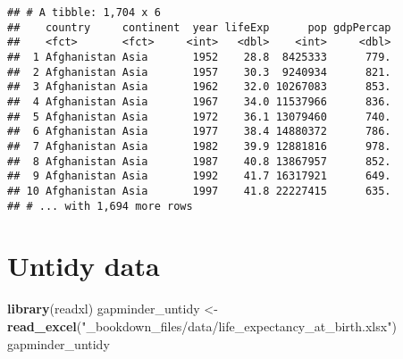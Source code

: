 \documentclass[]{book}
\newenvironment{Shaded}{\begin{snugshade}}{\end{snugshade}}
\newcommand{\KeywordTok}[1]{\textcolor[rgb]{0.13,0.29,0.53}{\textbf{#1}}}
\newcommand{\NormalTok}[1]{#1}
\newcommand{\StringTok}[1]{\textcolor[rgb]{0.31,0.60,0.02}{#1}}
\begin{document}
\begin{verbatim}
## # A tibble: 1,704 x 6
##    country     continent  year lifeExp      pop gdpPercap
##    <fct>       <fct>     <int>   <dbl>    <int>     <dbl>
##  1 Afghanistan Asia       1952    28.8  8425333      779.
##  2 Afghanistan Asia       1957    30.3  9240934      821.
##  3 Afghanistan Asia       1962    32.0 10267083      853.
##  4 Afghanistan Asia       1967    34.0 11537966      836.
##  5 Afghanistan Asia       1972    36.1 13079460      740.
##  6 Afghanistan Asia       1977    38.4 14880372      786.
##  7 Afghanistan Asia       1982    39.9 12881816      978.
##  8 Afghanistan Asia       1987    40.8 13867957      852.
##  9 Afghanistan Asia       1992    41.7 16317921      649.
## 10 Afghanistan Asia       1997    41.8 22227415      635.
## # ... with 1,694 more rows
\end{verbatim}

\hypertarget{untidy-data}{%
\section{Untidy data}\label{untidy-data}}

\begin{Shaded}
\begin{Highlighting}[]
\KeywordTok{library}\NormalTok{(readxl)}
\NormalTok{gapminder_untidy <-}\StringTok{ }\KeywordTok{read_excel}\NormalTok{(}\StringTok{"_bookdown_files/data/life_expectancy_at_birth.xlsx"}\NormalTok{)}
\NormalTok{gapminder_untidy }
\end{Highlighting}
\end{Shaded}
\end{document}
